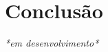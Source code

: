 \documentclass[
	12pt,				%
	openright,			%
	oneside,			%
	a4paper,			%
	english,			%
	brazil,				%
	]{abntex2}
\begin{document}
\chapter*[Conclusão]{Conclusão}

\emph{*em desenvolvimento*}


\postextual


%


%
%


\printindex
\end{document}
